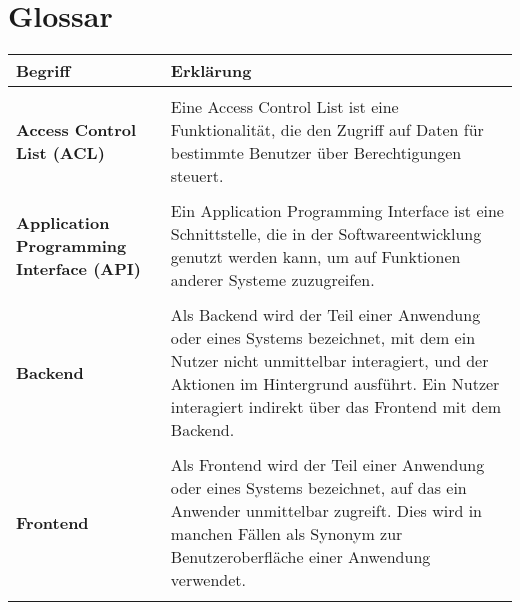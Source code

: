 \chapter{Glossar}

\begin{longtable}{p{5cm}p{10cm}}
    \textbf{Begriff} & \textbf{Erklärung} \\
    \hline
    \\
    \textbf{Access Control List (ACL)} & Eine Access Control List ist eine Funktionalität, die den Zugriff auf Daten für bestimmte Benutzer über Berechtigungen steuert. \\\\
    \textbf{Application Programming Interface (API)} & Ein Application Programming Interface ist eine Schnittstelle, die in der Softwareentwicklung genutzt werden kann, um auf Funktionen anderer Systeme zuzugreifen. \\\\
    \textbf{Backend} & Als Backend wird der Teil einer Anwendung oder eines Systems bezeichnet, mit dem ein Nutzer nicht unmittelbar interagiert, und der Aktionen im Hintergrund ausführt. Ein Nutzer interagiert indirekt über das Frontend mit dem Backend. \\\\
    \textbf{Frontend} & Als Frontend wird der Teil einer Anwendung oder eines Systems bezeichnet, auf das ein Anwender unmittelbar zugreift. Dies wird in manchen Fällen als Synonym zur Benutzeroberfläche einer Anwendung verwendet. \\\\
\end{longtable}
